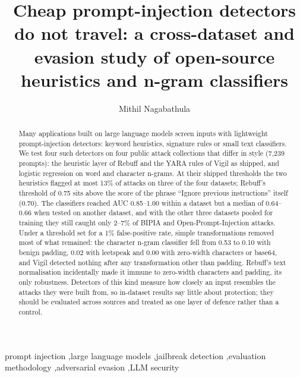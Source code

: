 \documentclass[preprint,12pt,authoryear]{elsarticle}
\begin{document}
\begin{frontmatter}

\title{Cheap prompt-injection detectors do not travel: a cross-dataset and evasion study of open-source heuristics and n-gram classifiers}

\author{Mithil Nagabathula}
\address{School of Architecture, Computing and Engineering, University of East London, University Way, London E16 2RD, United Kingdom}

\begin{abstract}
Many applications built on large language models screen inputs with lightweight prompt-injection detectors: keyword
heuristics, signature rules or small text classifiers. We test four such detectors on four public attack collections that
differ in style (7{,}239 prompts): the heuristic layer of Rebuff and the YARA rules of Vigil as shipped, and logistic regression
on word and character n-grams. At their shipped thresholds the two heuristics flagged at most 13\% of attacks on three of the
four datasets; Rebuff's threshold of 0.75 sits above the score of the phrase ``Ignore previous instructions'' itself (0.70).
The classifiers reached AUC 0.85--1.00 within a dataset but a median of 0.64--0.66 when tested on another dataset, and with
the other three datasets pooled for training they still caught only 2--7\% of BIPIA and Open-Prompt-Injection attacks. Under a
threshold set for a 1\% false-positive rate, simple transformations removed most of what remained: the character n-gram
classifier fell from 0.53 to 0.10 with benign padding, 0.02 with leetspeak and 0.00 with zero-width characters or base64, and
Vigil detected nothing after any transformation other than padding. Rebuff's text normalisation incidentally made it immune to
zero-width characters and padding, its only robustness. Detectors of this kind measure how closely an input resembles the
attacks they were built from, so in-dataset results say little about protection; they should be evaluated across sources
and treated as one layer of defence rather than a control.
\end{abstract}

\begin{keyword}
prompt injection \sep large language models \sep jailbreak detection \sep evaluation methodology \sep adversarial evasion \sep LLM security
\end{keyword}

\end{frontmatter}
\end{document}
